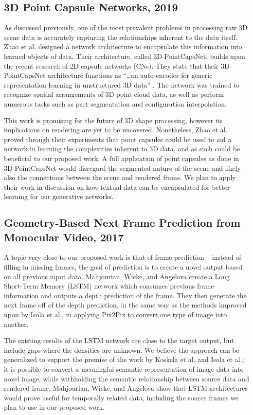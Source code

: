 \documentclass{article}
\begin{document}
\subsection*{3D Point Capsule Networks, 2019}
\nocite{3D_capsule_networks}
As discussed previously, one of the most prevalent problems in processing raw 3D
scene data is accurately capturing the relationships inherent to the data itself.
Zhao et al. designed a network architecture to encapsulate this information into
learned objects of data. Their architecture, called 3D-PointCapsNet,
builds upon the recent research of 2D capsule networks (CNs).
They state that their 3D-PointCapsNet architecture functions as
``\dots an auto-encoder for generic representation
learning in unstructured 3D data'' \cite{3D_capsule_networks}.
The network was trained
to recognize spatial arrangements of 3D point cloud data, as well as perform
numerous tasks such as part segmentation and configuration interpolation.

This work is promising for the future of 3D shape processing, however its
implications on rendering are yet to be uncovered. Nonetheless, Zhao et al.
proved through their experiments that point capsules could be used to
aid a network in learning the complexities inherent to 3D data, and as such
could be beneficial to our proposed work. A full application of point capsules
as done in 3D-PointCapsNet would disregard the segmented nature of the scene and
likely also the connections between the scene and rendered frame.
We plan to apply their work in discussion on how textual data can be encapsulated
for better learning for our generative networks.

\subsection*{Geometry-Based Next Frame Prediction from Monocular Video, 2017}
\nocite{frame_prediction}
A topic very close to our proposed work is that of frame prediction --
instead of filling in missing frames, the goal of prediction is to create a novel
output based on all previous input data.
Mahjourian, Wicke, and Angelova create a Long Short-Term Memory (LSTM) network
which consumes previous frame information and outputs a depth prediction of the
frame. They then generate the next frame off of the depth prediction, in the same
way as the methods improved upon by Isola et al., in applying Pix2Pix to convert 
one type of image into another.

The existing results of the LSTM network are close to the
target output, but include gaps where the densities are unknown.
We believe the approach can be generalized to support the premise of
the work by Koskela et al. and Isola et al.;
it is possible to convert a meaningful semantic representation
of image data into novel image, while withholding the semantic relationship
between source data and rendered frame. Mahjourian, Wicke, and Angelova show that
LSTM architectures would prove useful for temporally related data,
including the source frames we plan to use in our proposed work.
\end{document}
